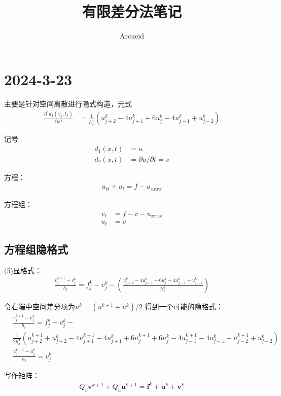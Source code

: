 \documentclass[UTF8]{ctexbook}
\title{有限差分法笔记}
\author{Arcueid}
\begin{document}
\maketitle
\section*{2024-3-23}
主要是针对空间离散进行隐式构造，元式
\begin{align}
    \frac{\partial^4 d_1 (x_j, t_k)}{\partial x^4} &= \frac{1}{h^4 _x}(
        u^k _{j+2}-4u^k _{j+1}+6u^k _j-4u^k _{j-1}+u^k _{j-2})
\end{align}

记号
\begin{align}
    d_1(x,t) &= u\\
    d_2(x, t) &= \partial u/\partial t =v
\end{align}

方程：
\begin{align}
    u_{tt}+u_t = f-u_{xxxx}
\end{align}

方程组：
\begin{align}
    v_t &= f-v-u_{xxxx}\\
    u_t &= v
\end{align}
\subsection{方程组隐格式}
(5)显格式：
\begin{align}
    \frac{v^{k+1}_j - v^k _j}{h_t}=f_j^k-v_j^k-\left(
        \frac{u^k _{j+2}-4u^k _{j+1}+6u^k _j-4u^k _{j-1}+u^k _{j-2}}{h_x^4}\right)
\end{align}

令右端中空间差分项为$u^k = (u^{k+1}+u^k)/2$
得到一个可能的隐格式：
\begin{align}
    &\frac{v^{k+1}_j - v^k _j}{h_t}=f_j^k-v_j^k-\\
    &\frac{1}{2h^4_x}\left(
        u^{k+1}_{j+2}+u^{k}_{j+2}
        -4u^{k+1}_{j+1}-4u^{k}_{j+1}
        + 6u^{k+1}_j+ 6u^{k}_j 
        - 4u^{k+1}_{j-1} - 4u^{k}_{j-1}
        + u^{k+1}_{j-2}+ u^{k}_{j-2}
        \right)\\
    &\frac{u^{k+1}_j - u^k _j}{h_t}=v^k_j
\end{align}

写作矩阵：
\begin{align}
    Q_v\mathbf{v}^{k+1}+Q_u\mathbf{u}^{k+1} = \mathbf{f}^k + \mathbf{u}^k+\mathbf{v}^k
\end{align}
\end{document}
